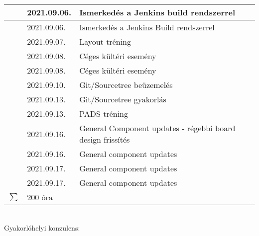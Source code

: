 \documentclass[9pt,a4paper,oneside]{report}
\newcounter{magicrownumbers}
\newcommand\rownum{\stepcounter{magicrownumbers}\arabic{magicrownumbers}}
\begin{document}
\begin{table}[h!]
\begin{tabular}{| c | p{3 cm} | p{10 cm} |}
	\rownum & 2021.09.06. & Ismerkedés a Jenkins build rendszerrel \\ \hline
	\rownum & 2021.09.06. & Ismerkedés a Jenkins Build rendszerrel \\ \hline
	\rownum & 2021.09.07. & Layout tréning \\ \hline
	\rownum & 2021.09.08. & Céges kültéri esemény \\ \hline
	\rownum & 2021.09.08. & Céges kültéri esemény \\ \hline
	\rownum & 2021.09.10. & Git/Sourcetree beüzemelés \\ \hline
	\rownum & 2021.09.13. & Git/Sourcetree gyakorlás \\ \hline
	\rownum & 2021.09.13. & PADS tréning \\ \hline
	\rownum & 2021.09.16. & General Component updates - régebbi board design frissítés \\ \hline
	\rownum & 2021.09.16. & General component updates \\ \hline
	\rownum & 2021.09.17. & General component updates \\ \hline
	\rownum & 2021.09.17. & General component updates \\ \hline
	$\sum$ & 200 óra& \\ \hline
	\end{tabular}
\end{table}
\vspace{.5 cm} \\
Gyakorlóhelyi konzulens:
\end{document}
